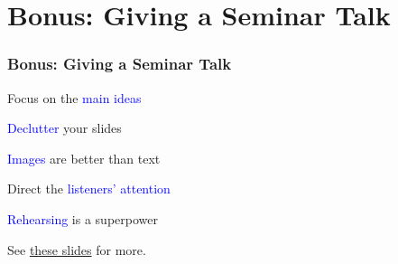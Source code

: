 \documentclass[xetex]{beamer}
\newcommand{\good}[1]{\textcolor{blue}{#1}}
\begin{document}
\section*{Bonus: Giving a Seminar Talk}

\begin{frame}
  \frametitle{Bonus: Giving a Seminar Talk}

  Focus on the \good{main ideas}

  \medskip
  \pause

  \good{Declutter} your slides

  \medskip
  \pause

  \good{Images} are better than text

  \medskip
  \pause

  Direct the \good{listeners' attention}

  \medskip
  \pause

  \good{Rehearsing} is a superpower

  \bigskip
  \pause

  See \href{https://docs.google.com/presentation/d/1T-w7SEXwFf3HxRMYF_EnRnAMT1_sfq6TrOwV7R6amHk/edit?usp=sharing}{these slides} for more.
\end{frame}
\end{document}
